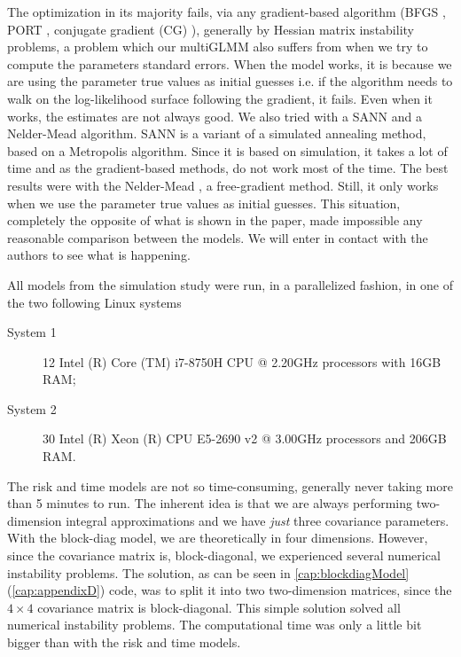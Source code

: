 The optimization in its majority fails, via any gradient-based algorithm
(BFGS \cite{nocedal&wright}, PORT \cite{PORTreport, PORTpaper},
conjugate gradient (CG) \cite{CG}), generally by Hessian matrix
instability problems, a problem which our multiGLMM also suffers from
when we try to compute the parameters standard errors. When the model
works, it is because we are using the parameter true values as initial
guesses i.e. if the algorithm needs to walk on the log-likelihood
surface following the gradient, it fails. Even when it works, the
estimates are not always good. We also tried with a SANN and a
Nelder-Mead algorithm. SANN \cite{SANN} is a variant of a simulated
annealing method, based on a Metropolis algorithm. Since it is based on
simulation, it takes a lot of time and as the gradient-based methods, do
not work most of the time. The best results were with the Nelder-Mead
\cite{neldermead}, a free-gradient method. Still, it only works when we
use the parameter true values as initial guesses. This situation,
completely the opposite of what is shown in the paper, made impossible
any reasonable comparison between the models. We will enter in contact
with the authors to see what is happening.

All models from the simulation study were run, in a parallelized
fashion, in one of the two following Linux systems
\begin{description}
 \item[System 1]
  12 Intel (R) Core (TM) i7-8750H CPU @ 2.20GHz processors
  with 16GB RAM;
 \item[System 2]
  30 Intel (R) Xeon (R) CPU E5-2690 v2 @ 3.00GHz processors
  and 206GB RAM.
\end{description}
The risk and time models are not so time-consuming, generally never
taking more than 5 minutes to run. The inherent idea is that we are
always performing two-dimension integral approximations and we have
\textit{just} three covariance parameters. With the block-diag model, we
are theoretically in four dimensions. However, since the covariance
matrix is, block-diagonal, we experienced several numerical instability
problems. The solution, as can be seen in \autoref{cap:blockdiagModel}
(\autoref{cap:appendixD}) code, was to split it into two two-dimension
matrices, since the \(4\times4\) covariance matrix is block-diagonal.
This simple solution solved all numerical instability problems. The
computational time was only a little bit bigger than with the risk and
time models.

